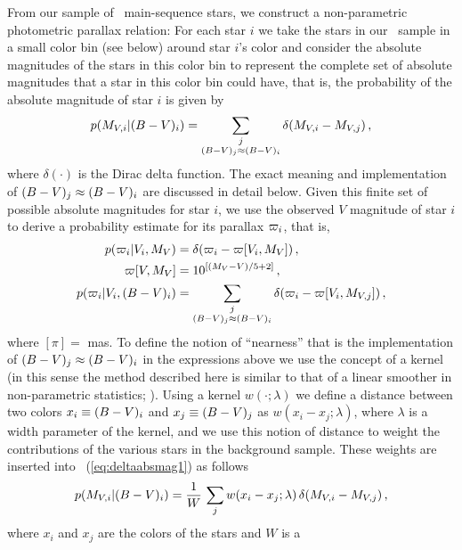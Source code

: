 From our sample of \nstarsms\ main-sequence stars, we construct a
non-parametric photometric parallax relation: For each star $i$ we
take the stars in our \Hipparcos\ sample in a small color bin (see
below) around star $i$'s color and consider the absolute magnitudes of
the stars in this color bin to represent the complete set of absolute
magnitudes that a star in this color bin could have, that is, the
probability of the absolute magnitude of star $i$ is given by
\begin{equation}\label{eq:deltaabsmag1}
p(M_{V,i} | (B-V)_i) = \sum_{\substack{j\\(B-V)_j \approx
    (B-V)_i}} \delta (M_{V,i}-M_{V,j})\,,
\end{equation}
where $\delta(\cdot)$ is the Dirac delta function. The exact meaning
and implementation of $(B-V)_j \approx (B-V)_i$ are
discussed in detail below. Given this finite set of possible absolute
magnitudes for star $i$, we use the observed $V$ magnitude of star $i$
to derive a probability estimate for its parallax $\varpi_i$, that
is,
\begin{align}\label{eq:photplx1}
p(\varpi_i | V_i,M_{V}) &= \delta(\varpi_i -
\varpi[V_i,M_{V}] )\,,\\ \varpi[V,M_V] &= 10^{\left[(M_V -
    V)/5+2
    \right]}\,,\label{eq:photplx2}\\ p(\varpi_i|V_i,(B-V)_i)
&= \sum_{\substack{j\\(B-V)_j \approx (B-V)_i}} \delta
(\varpi_i - \varpi[V_i,M_{V,j}] )\,,
\end{align}
where $[\pi] = $ mas. To define the notion of ``nearness'' that is the
implementation of $(B-V)_j \approx (B-V)_i$ in the
expressions above we use the concept of a kernel (in this sense the
method described here is similar to that of a linear smoother in
non-parametric statistics; \citealt{Wasserman05a}). Using a kernel
$w(\cdot;\lambda)$ we define a distance between two colors $x_i \equiv
(B-V)_i$ and $x_j \equiv (B-V)_j$ as $w(x_i-x_j;\lambda)$,
where $\lambda$ is a width parameter of the kernel, and we use this
notion of distance to weight the contributions of the various stars in
the background sample. These weights are inserted into
\eqnname~(\ref{eq:deltaabsmag1}) as follows
\begin{equation}\label{eq:deltaabsmag2}
p(M_{V,i} | (B-V)_i) = \frac{1}{W}\,\sum_j
w(x_i-x_j;\lambda)\,\delta (M_{V,i}-M_{V,j})\,,
\end{equation}
where $x_i$ and $x_j$ are the colors of the stars and $W$ is a
